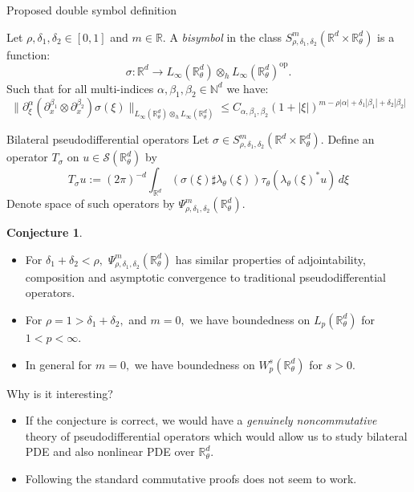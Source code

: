 \documentclass{beamer}
\numberwithin{equation}{section}
\theoremstyle{plain}
\theoremstyle{plain}
\theoremstyle{definition}
\theoremstyle{plain}
\theoremstyle{plain}
\theoremstyle{definition}
\newtheorem{conjecture}{Conjecture}
\newcommand{\Rl}{\mathbb{R}}
\newcommand{\Ntrl}{\mathbb{N}}
\newcommand{\Sc}{\mathcal{S}}
\newcommand{\dmult}{\sharp}
\newcommand{\op}{\mathrm{op}}
\begin{document}
\begin{frame}{Proposed double symbol definition}
\begin{definition}
    Let $\rho,\delta_1,\delta_2 \in [0,1]$ and $m \in \Rl$. A \emph{bisymbol} in the class $S^m_{\rho,\delta_1,\delta_2}(\Rl^d\times \Rl^d_\theta)$
    is a function:
    \begin{equation*}
        \sigma:\Rl^d\to L_\infty(\Rl^d_\theta)\otimes_h L_\infty(\Rl^d_\theta)^\op.
    \end{equation*}
    Such that for all multi-indices $\alpha,\beta_1,\beta_2\in \Ntrl^d$ we have:
    \begin{equation*}
        \|\partial_\xi^\alpha (\partial_x^{\beta_1}\otimes \partial_x^{\beta_2})\sigma(\xi)\|_{L_\infty(\Rl^d_\theta)\otimes_h L_\infty(\Rl^d_\theta)} \leq C_{\alpha,\beta_1,\beta_2}(1+|\xi|)^{m-\rho|\alpha|+\delta_1|\beta_1|+\delta_2|\beta_2|}
    \end{equation*}
\end{definition}
\end{frame}

\begin{frame}{Bilateral pseudodifferential operators}
Let $\sigma\in S^m_{\rho,\delta_1,\delta_2}(\Rl^d\times \Rl^d_\theta).$ Define an operator $T_{\sigma}$ on $u\in \Sc(\Rl^d_\theta)$ by
\begin{equation*}
    T_\sigma u := (2\pi)^{-d}\int_{\Rl^d} (\sigma(\xi)\dmult \lambda_\theta(\xi))\tau_\theta(\lambda_\theta(\xi)^*u)\,d\xi
\end{equation*}
Denote space of such operators by $\Psi^{m}_{\rho,\delta_1,\delta_2}(\Rl^d_\theta).$
\pause
\begin{conjecture}
\begin{itemize}
    \item{} For $\delta_1+\delta_2<\rho,$ $\Psi^m_{\rho,\delta_1,\delta_2}(\Rl^d_\theta)$ has similar properties of adjointability, composition and asymptotic convergence to traditional pseudodifferential operators. \pause
    \item{} For $\rho=1>\delta_1+\delta_2,$ and $m=0,$ we have boundedness on $L_p(\Rl^d_\theta)$ for $1<p<\infty.$
    \item{} In general for $m=0,$ we have boundedness on $W^s_p(\Rl^d_\theta)$ for $s>0.$
\end{itemize}
\end{conjecture}
\end{frame}

\begin{frame}{Why is it interesting?}
\begin{itemize}
    \item{} If the conjecture is correct, we would have a \emph{genuinely noncommutative} theory of pseudodifferential operators which would allow us to study bilateral PDE and also nonlinear PDE
    over $\Rl^d_\theta.$
    \item{} Following the standard commutative proofs does not seem to work.
\end{itemize}
\end{frame}

\begin{frame}
\end{frame}
\end{document}

